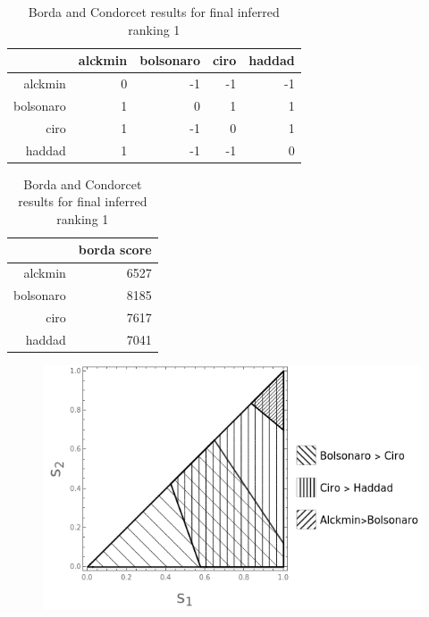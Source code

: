 \documentclass[hidelinks,11pt]{article}
\begin{document}
\begin{table}[h]
\begin{subtable}[h]{0.4\textwidth}
\centering
\begin{tabular}{rrrrr}
  \hline
 & alckmin & bolsonaro & ciro & haddad \\
  \hline
alckmin & 0 & -1 & -1 & -1 \\
  bolsonaro & 1 & 0 & 1 & 1 \\
  ciro & 1 & -1 & 0 & 1 \\
  haddad & 1 & -1 & -1 & 0 \\
   \hline
\end{tabular}
\caption{Pairwise Majority Comparisons}
\label{tbl:subtab1}
\end{subtable}
\hfill
\begin{subtable}[h]{0.4\textwidth}
  \centering
\begin{tabular}{rr}
  \hline
 & borda score \\
  \hline
alckmin & 6527 \\
  bolsonaro & 8185 \\
  ciro & 7617 \\
  haddad & 7041 \\
   \hline
\end{tabular}
\caption{Borda scores}
\label{tbl:subtab2}
\end{subtable}
\caption{Borda and Condorcet results for final inferred ranking 1}
\label{tbl:tab1}
\end{table}


\begin{figure}[H]
 \centering
 \includegraphics[width=\columnwidth,
 height=0.3\textheight]{./images/positional_results.png}

 \label{fig:positional4c}
\end{figure}
\end{document}

